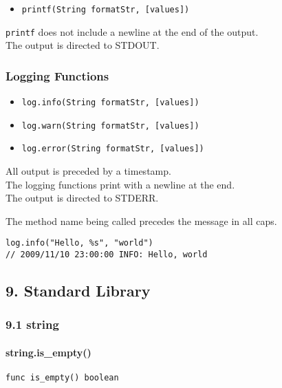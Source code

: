 \documentclass[]{article}
\begin{document}
\begin{itemize}
\itemsep1pt\parskip0pt
\item
  \texttt{printf(String formatStr, {[}values{]})}
\end{itemize}

\texttt{printf} does not include a newline at the end of the
output.\\The output is directed to STDOUT.

\subsubsection{Logging Functions}\label{logging-functions}

\begin{itemize}
\itemsep1pt\parskip0pt
\item
  \texttt{log.info(String formatStr, {[}values{]})}
\item
  \texttt{log.warn(String formatStr, {[}values{]})}
\item
  \texttt{log.error(String formatStr, {[}values{]})}
\end{itemize}

All output is preceded by a timestamp.\\The logging functions print with
a newline at the end.\\The output is directed to STDERR.

The method name being called precedes the message in all caps.

\begin{verbatim}
log.info("Hello, %s", "world")
// 2009/11/10 23:00:00 INFO: Hello, world
\end{verbatim}

\subsection{9. Standard Library}\label{standard-library}

\subsubsection{9.1 string}\label{string}

\paragraph{string.is\_empty()}\label{string.isux5fempty}

\begin{verbatim}
func is_empty() boolean
\end{verbatim}
\end{document}
